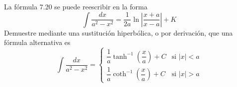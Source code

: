 \item La fórmula 7.20 se puede reescribir en la forma
    \[ \int \frac{dx}{a^2 - x^2} = \frac{1}{2a} \ln \left| \frac{x + a}{x - a} \right| + K \]
    Demuestre mediante una sustitución hiperbólica, o por derivación, que una fórmula alternativa es
    \[ \int \frac{dx}{a^2 - x^2} = \begin{cases} 
      \dfrac{1}{a} \tanh^{-1}\left(\dfrac{x}{a}\right) + C & \text{si } |x| < a \\ 
      \dfrac{1}{a} \coth^{-1}\left(\dfrac{x}{a}\right) + C & \text{si } |x| > a 
   \end{cases} \]
